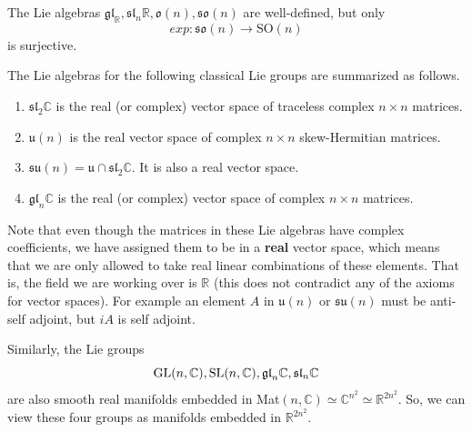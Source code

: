     \begin{theorem}
      The Lie algebras $\mathfrak{gl}_ \mathbb{R}, \mathfrak{sl}_n \mathbb{R}, \mathfrak{o}(n), \mathfrak{so}(n)$ are well-defined, but only 
      \begin{equation}
        exp: \mathfrak{so}(n) \longrightarrow \text{SO}(n)
      \end{equation}
      is surjective. 
    \end{theorem}

    \begin{theorem}
      The Lie algebras for the following classical Lie groups are summarized as follows. 
      \begin{enumerate}
        \item $\mathfrak{sl}_2 \mathbb{C}$ is the real (or complex) vector space of traceless complex $n \times n$ matrices. 
        \item $\mathfrak{u}(n)$ is the real vector space of complex $n \times n$ skew-Hermitian matrices. 
        \item $\mathfrak{su}(n) = \mathfrak{u} \cap \mathfrak{sl}_2 \mathbb{C}$. It is also a real vector space. 
        \item $\mathfrak{gl}_n \mathbb{C}$ is the real (or complex) vector space of complex $n \times n$ matrices. 
      \end{enumerate}
      Note that even though the matrices in these Lie algebras have complex coefficients, we have assigned them to be in a \textbf{real} vector space, which means that we are only allowed to take real linear combinations of these elements. That is, the field we are working over is $\mathbb{R}$ (this does not contradict any of the axioms for vector spaces). For example an element $A$ in $\mathfrak{u}(n)$ or $\mathfrak{su}(n)$ must be anti-self adjoint, but $iA$ is self adjoint. 
    \end{theorem}

    Similarly, the Lie groups 
    \begin{equation}
      \operatorname{GL}(n, \mathbb{C}), \operatorname{SL}(n, \mathbb{C}), \mathfrak{gl}_n \mathbb{C}, \mathfrak{sl}_n \mathbb{C}
    \end{equation}
    are also smooth real manifolds embedded in Mat$(n, \mathbb{C}) \simeq \mathbb{C}^{n^2} \simeq \mathbb{R}^{2 n^2}$. So, we can view these four groups as manifolds embedded in $\mathbb{R}^{2 n^2}$. 


